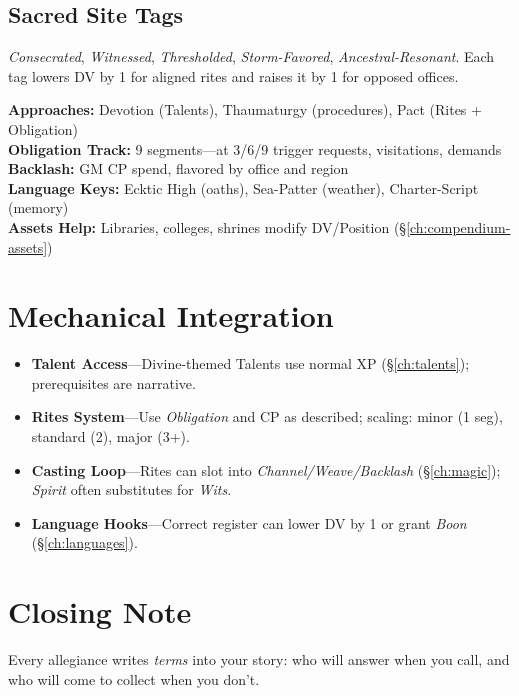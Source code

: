 \begin{multicols}{2}
\subsection*{Sacred Site Tags}
\textit{Consecrated}, \textit{Witnessed}, \textit{Thresholded}, \textit{Storm-Favored}, \textit{Ancestral-Resonant}. Each tag lowers DV by 1 for aligned rites and raises it by 1 for opposed offices.

\begin{tcolorbox}[colback=purple!5!white,colframe=purple!75!black,title=Divine \& Patron Quick Reference,fonttitle=\bfseries]
\textbf{Approaches:} Devotion (Talents), Thaumaturgy (procedures), Pact (Rites + Obligation) \\
\textbf{Obligation Track:} 9 segments—at 3/6/9 trigger requests, visitations, demands \\
\textbf{Backlash:} GM CP spend, flavored by office and region \\
\textbf{Language Keys:} Ecktic High (oaths), Sea-Patter (weather), Charter-Script (memory) \\
\textbf{Assets Help:} Libraries, colleges, shrines modify DV/Position (\S\ref{ch:compendium-assets})
\end{tcolorbox}

\section{Mechanical Integration}
\begin{itemize}
  \item \textbf{Talent Access}—Divine-themed Talents use normal XP (\S\ref{ch:talents}); prerequisites are narrative.
  \item \textbf{Rites System}—Use \emph{Obligation} and CP as described; scaling: minor (1 seg), standard (2), major (3+).
  \item \textbf{Casting Loop}—Rites can slot into \emph{Channel/Weave/Backlash} (\S\ref{ch:magic}); \emph{Spirit} often substitutes for \emph{Wits}.
  \item \textbf{Language Hooks}—Correct register can lower DV by 1 or grant \emph{Boon} (\S\ref{ch:languages}).
\end{itemize}

\section*{Closing Note}
Every allegiance writes \emph{terms} into your story: who will answer when you call, and who will come to collect when you don’t.

\end{multicols}

